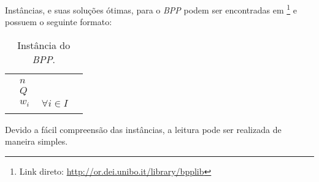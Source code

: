 Instâncias, e suas soluções ótimas, para o \textit{BPP} podem ser encontradas em \cite{bpplib}\footnote{Link direto: \url{http://or.dei.unibo.it/library/bpplib}} e possuem o seguinte formato:

\begin{table}[htpb!]
\centering
\begin{tabular}{|llll|}
\hline
 &         &                          &  \\
 & $ n $   &                          &  \\
 & $ Q $   &                          &  \\
 & $ w_i $ & $ \ \forall  i  \in  I $ &  \\
 &         &                          &  \\ \hline
\end{tabular}
\caption{Instância do \textit{BPP}.}
\end{table}

Devido a fácil compreensão das instâncias, a leitura pode ser realizada de maneira simples.